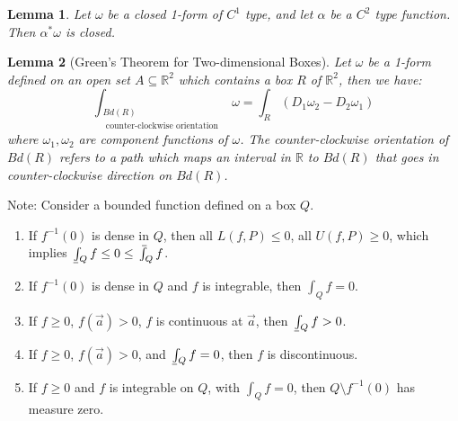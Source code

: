 \documentclass[11pt]{article}
\theoremstyle{break}
\theoremstyle{break}
\newtheorem{lem}{Lemma}[thm]
\def\upint{\mathchoice%
    {\mkern13mu\overline{\vphantom{\intop}\mkern7mu}\mkern-20mu}%
    {\mkern7mu\overline{\vphantom{\intop}\mkern7mu}\mkern-14mu}%
    {\mkern7mu\overline{\vphantom{\intop}\mkern7mu}\mkern-14mu}%
    {\mkern7mu\overline{\vphantom{\intop}\mkern7mu}\mkern-14mu}%
  \int}
\def\lowint{\mkern3mu\underline{\vphantom{\intop}\mkern7mu}\mkern-10mu\int}
\newcommand{\R}{\mathbb{R}}
\newcommand{\note}{\color{red}Note: \color{black}}
\begin{document}
\begin{lem}
Let $\omega$ be a closed 1-form of $C^1$ type, and let $\alpha$ be a $C^2$ type function. Then $\alpha^*\omega$ is closed. 
\end{lem}


\begin{lem}[Green's Theorem for Two-dimensional Boxes]
Let $\omega$ be a 1-form defined on an open set $A\subseteq \R^2$ which contains a box $R$ of $\R^2$, then we have: 
$$\int_{\substack{{Bd(R)}\\ \text{ counter-clockwise orientation}}} \omega = \int_R (D_1\omega_2 - D_2\omega_1)$$ 
where $\omega_1,\omega_2$ are component functions of $\omega$. The counter-clockwise orientation of $Bd(R)$ refers to a path which maps an interval in $\R$ to $Bd(R)$ that goes in counter-clockwise direction on $Bd(R)$.
\end{lem}



\newpage
\note Consider a bounded function defined on a box $Q$.
\begin{enumerate}[topsep=3pt,itemsep=-1ex,partopsep=1ex,parsep=1ex]
\item If $f^{-1}(0)$ is dense in $Q$, then all $L(f,P) \leq 0$, all $U(f,P) \geq 0$, which implies $\lowint_Q f \leq 0 \leq \upint_Q f$.
\item If $f^{-1}(0)$ is dense in $Q$ and $f$ is integrable, then $\int_Q f = 0$.
\item If $f \geq 0$, $f(\vec{a}) > 0$, $f $ is continuous at $\vec{a}$, then $\lowint_Q f > 0$. 
\item If $f \geq 0$, $f(\vec{a}) > 0$, and $\lowint_Q f =0$, then $f$ is discontinuous.
\item If $f \geq 0$ and $f$ is integrable on $Q$, with $\int_Q f = 0$, then $Q \setminus f^{-1}(0)$ has measure zero. 
\end{enumerate}
\end{document}
